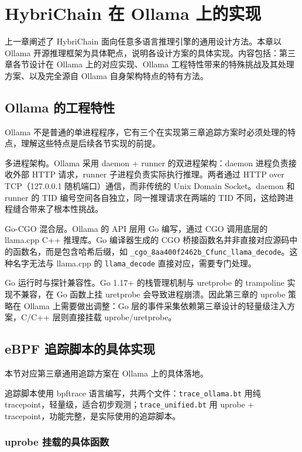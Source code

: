 
\chapter{HybriChain 在 Ollama 上的实现}
\label{chap:implementation}

上一章阐述了 HybriChain 面向任意多语言推理引擎的通用设计方法。本章以 Ollama 开源推理框架为具体靶点，说明各设计方案的具体实现。内容包括：第三章各节设计在 Ollama 上的对应实现、Ollama 工程特性带来的特殊挑战及其处理方案、以及完全源自 Ollama 自身架构特点的特有方法。

\section{Ollama 的工程特性}

Ollama 不是普通的单进程程序，它有三个在实现第三章追踪方案时必须处理的特点，理解这些特点是后续各节实现的前提。

多进程架构。Ollama 采用 daemon + runner 的双进程架构：daemon 进程负责接收外部 HTTP 请求，runner 子进程负责实际执行推理。两者通过 HTTP over TCP（127.0.0.1 随机端口）通信，而非传统的 Unix Domain Socket。daemon 和 runner 的 TID 编号空间各自独立，同一推理请求在两端的 TID 不同，这给跨进程缝合带来了根本性挑战。

Go-CGO 混合层。Ollama 的 API 层用 Go 编写，通过 CGO 调用底层的 llama.cpp C++ 推理库。Go 编译器生成的 CGO 桥接函数名并非直接对应源码中的函数名，而是包含哈希后缀，如 \texttt{\_cgo\_8aa400f2462b\_Cfunc\_llama\_decode}。这种名字无法与 llama.cpp 的 \texttt{llama\_decode} 直接对应，需要专门处理。

Go 运行时与探针兼容性。Go 1.17+ 的栈管理机制与 uretprobe 的 trampoline 实现不兼容，在 Go 函数上挂 uretprobe 会导致进程崩溃。因此第三章的 uprobe 策略在 Ollama 上需要做出调整：Go 层的事件采集依赖第三章设计的轻量级注入方案，C/C++ 层则直接挂载 uprobe/uretprobe。

\section{eBPF 追踪脚本的具体实现}

本节对应第三章通用追踪方案在 Ollama 上的具体落地。

追踪脚本使用 bpftrace 语言编写，共两个文件：\texttt{trace\_ollama.bt} 用纯 tracepoint，轻量级，适合初步观测；\texttt{trace\_unified.bt} 用 uprobe + tracepoint，功能完整，是实际使用的追踪脚本。

\subsection{uprobe 挂载的具体函数}

